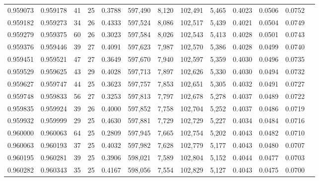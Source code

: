 \begin{tabular}{rrrrrrrrrrrrr}
0.959073 & 0.959178 &    41 &  25 &                                     0.3788 & 597,490 &   8,120 & 102,491 &   5,465 & 0.4023 & 0.0506 & 0.0752 \\
0.959182 & 0.959273 &    34 &  26 &                                     0.4333 & 597,524 &   8,086 & 102,517 &   5,439 & 0.4021 & 0.0504 & 0.0749 \\
0.959279 & 0.959375 &    60 &  26 &                                     0.3023 & 597,584 &   8,026 & 102,543 &   5,413 & 0.4028 & 0.0501 & 0.0743 \\
0.959376 & 0.959446 &    39 &  27 &                                     0.4091 & 597,623 &   7,987 & 102,570 &   5,386 & 0.4028 & 0.0499 & 0.0740 \\
0.959451 & 0.959521 &    47 &  27 &                                     0.3649 & 597,670 &   7,940 & 102,597 &   5,359 & 0.4030 & 0.0496 & 0.0735 \\
0.959529 & 0.959625 &    43 &  29 &                                     0.4028 & 597,713 &   7,897 & 102,626 &   5,330 & 0.4030 & 0.0494 & 0.0732 \\
0.959627 & 0.959747 &    44 &  25 &                                     0.3623 & 597,757 &   7,853 & 102,651 &   5,305 & 0.4032 & 0.0491 & 0.0727 \\
0.959748 & 0.959833 &    56 &  27 &                                     0.3253 & 597,813 &   7,797 & 102,678 &   5,278 & 0.4037 & 0.0489 & 0.0722 \\
0.959835 & 0.959924 &    39 &  26 &                                     0.4000 & 597,852 &   7,758 & 102,704 &   5,252 & 0.4037 & 0.0486 & 0.0719 \\
0.959932 & 0.959999 &    29 &  25 &                                     0.4630 & 597,881 &   7,729 & 102,729 &   5,227 & 0.4034 & 0.0484 & 0.0716 \\
0.960000 & 0.960063 &    64 &  25 &                                     0.2809 & 597,945 &   7,665 & 102,754 &   5,202 & 0.4043 & 0.0482 & 0.0710 \\
0.960063 & 0.960193 &    37 &  25 &                                     0.4032 & 597,982 &   7,628 & 102,779 &   5,177 & 0.4043 & 0.0480 & 0.0707 \\
0.960195 & 0.960281 &    39 &  25 &                                     0.3906 & 598,021 &   7,589 & 102,804 &   5,152 & 0.4044 & 0.0477 & 0.0703 \\
0.960282 & 0.960343 &    35 &  25 &                                     0.4167 & 598,056 &   7,554 & 102,829 &   5,127 & 0.4043 & 0.0475 & 0.0700 \\

\end{tabular}
